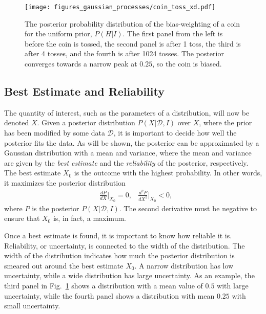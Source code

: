 \documentclass[twoside,english]{uiofysmaster}
\begin{document}
{\begin{figure}
\texttt{[image: figures\_gaussian\_processes/coin\_toss\_xd.pdf]}
\caption{The posterior probability distribution of the bias-weighting of a coin for the uniform prior, $P(H|I)$. The first panel from the left is before the coin is tossed, the second panel is after 1 toss, the third is after 4 tosses, and the fourth is after 1024 tosses. The posterior converges towards a narrow peak at $0.25$, so the coin is biased.}
\label{Fig:: gaussian process : Dice throw }
\end{figure}


\subsection{Best Estimate and Reliability}\label{Sec:: gaussian process : Best estimate}

The quantity of interest, such as the parameters of a distribution, will now be denoted $X$. Given a posterior distribution $P(X| \mathcal{D}, I)$ over $X$, where the prior has been modified by some data $\mathcal{D}$, it is important to decide how well the posterior fits the data. As will be shown, the posterior can be approximated by a Gaussian distribution with a mean and variance, where the mean and variance are given by the \textit{best estimate} and the \textit{reliability} of the posterior, respectively. The best estimate $X_0$  is the outcome with the highest probability. In other words, it maximizes the posterior distribution
\begin{align}\label{Eq:: gaussian process : max of posterior}
&\frac{dP}{dX}\Big|_{X_0} = 0, &\frac{d^2P}{dX^2}\Big|_{X_0} < 0,
\end{align}
where $P$ is the posterior $P(X| \mathcal{D}, I)$. The second derivative must be negative to ensure that $X_0$ is, in fact, a maximum. 

Once a best estimate is found, it is important to know how reliable it is. Reliability, or uncertainty, is connected to the width of the distribution. The width of the distribution indicates how much the posterior distribution is smeared out around the best estimate $X_0$. A narrow distribution has low uncertainty, while a wide distribution has large uncertainty. As an example, the third panel in Fig.~\ref{Fig:: gaussian process : Dice throw } shows a distribution with a mean value of $0.5$ with large uncertainty, while the fourth panel shows a distribution with mean $0.25$ with small uncertainty. 

}
\end{document}
